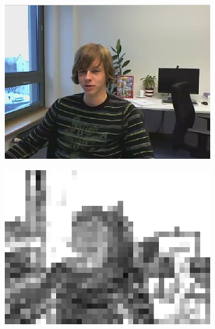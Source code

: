 \documentclass[11pt]{article} %
\begin{document}
\begin{figure}
	\centering
	\begin{subfigure}[t]{0.49\textwidth}
		\centering
		\includegraphics[width=\textwidth]{RC_bit_allocation/Paul250kbps_ROI_bit_alloc.png}
		\caption{}
		\label{fig:ROI bit-allocation result image}
	\end{subfigure}
	\begin{subfigure}[t]{0.49\textwidth}
		\centering
		\includegraphics[width=\textwidth]{RC_bit_allocation/Paul250kbps_ROI_bit_alloc_psnr_abs45.png}
		\caption{}
		\label{fig:ROI bit-allocation result psnr}
	\end{subfigure}
	\begin{subfigure}[t]{\textwidth}

\end{subfigure}
\end{figure}
\end{document}
